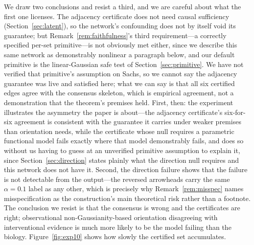 \documentclass[pdflatex,sn-apa]{sn-jnl}
\theoremstyle{thmstyleone}%
\theoremstyle{thmstyletwo}%
\theoremstyle{thmstylethree}%
\begin{document}
We draw two conclusions and resist a third, and we are careful about what the
first one licenses. The adjacency certificate does not need causal
sufficiency (Section~\ref{sec:latent}), so the network's confounding does not
by itself void its guarantee; but Remark~\ref{rem:faithfulness}'s third
requirement---a correctly specified per-set primitive---is not obviously met
either, since we describe this same network as demonstrably nonlinear a
paragraph below, and our default primitive is the linear-Gaussian safe test
of Section~\ref{sec:primitive}. We have not verified that primitive's
assumption on Sachs, so we cannot say the adjacency guarantee was live and
satisfied here; what we can say is that all six certified edges agree with
the consensus skeleton, which is empirical agreement, not a demonstration
that the theorem's premises held. First, then: the experiment illustrates the
asymmetry the paper is about---the adjacency certificate's six-for-six
agreement is consistent with the guarantee it carries under weaker premises
than orientation needs, while the certificate whose null requires a
parametric functional model fails exactly where that model demonstrably
fails, and does so without us having to guess at an unverified primitive
assumption to explain it, since Section~\ref{sec:direction} states plainly
what the direction null requires and this network does not have it. Second,
the direction failure shows that the failure is not detectable from the
output---the reversed arrowheads carry the same $\alpha = 0.1$ label as any
other, which is precisely why Remark~\ref{rem:misspec} names misspecification
as the construction's main theoretical risk rather than a footnote. The
conclusion we resist is that the consensus is wrong and the certificates are
right; observational non-Gaussianity-based orientation disagreeing with
interventional evidence is much more likely to be the model failing than the
biology.
Figure~\ref{fig:exp10} shows how slowly the certified set accumulates.
\end{document}
